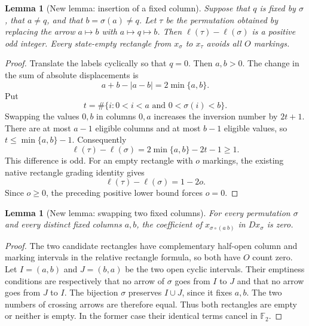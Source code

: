 \documentclass[11pt,oneside]{report}
\newtheorem{lemma}[theorem]{Lemma}
\theoremstyle{definition}
\numberwithin{equation}{section}
\begin{document}
\begin{lemma}[New lemma: insertion of a fixed column]
\label{J21:lem:torus-insertion-increases}
Suppose that $q$ is fixed by $\sigma$, that $a\neq q$, and that
$b=\sigma(a)\neq q$. Let $\tau$ be the permutation obtained by replacing
the arrow $a\mapsto b$ with $a\mapsto q\mapsto b$. Then
$\ell(\tau)-\ell(\sigma)$ is a positive odd integer.
Every state-empty rectangle from $x_\sigma$ to $x_\tau$ avoids all
$O$ markings.
\end{lemma}
\begin{proof}
Translate the labels cyclically so that $q=0$. Then $a,b>0$.
The change in the sum of absolute displacements is
\[
 a+b-|a-b|=2\min\{a,b\}.
\]
Put
\[
 t=\#\{i:0<i<a\text{ and }0<\sigma(i)<b\}.
\]
Swapping the values $0,b$ in columns $0,a$ increases the inversion
number by $2t+1$. There are at most $a-1$ eligible columns and at most
$b-1$ eligible values, so $t\leq\min\{a,b\}-1$. Consequently
\[
 \ell(\tau)-\ell(\sigma)=2\min\{a,b\}-2t-1\geq1.
\]
This difference is odd. For an empty rectangle with $o$ markings, the
existing native rectangle grading identity gives
\[
 \ell(\tau)-\ell(\sigma)=1-2o.
\]
Since $o\geq0$, the preceding positive lower bound forces $o=0$.
\end{proof}

\begin{lemma}[New lemma: swapping two fixed columns]
\label{J21:lem:torus-fixed-columns-cancel}
For every permutation $\sigma$ and every distinct fixed columns $a,b$,
the coefficient of $x_{\sigma\circ(a\ b)}$ in $D x_\sigma$ is zero.
\end{lemma}
\begin{proof}
The two candidate rectangles have complementary half-open column and
marking intervals in the relative rectangle formula, so both have
$O$ count zero. Let $I=(a,b)$ and $J=(b,a)$ be the two open cyclic
intervals. Their emptiness conditions are respectively that no arrow
of $\sigma$ goes from $I$ to $J$ and that no arrow goes from $J$ to $I$.
The bijection $\sigma$ preserves $I\cup J$, since it fixes $a,b$.
The two numbers of crossing arrows are therefore equal. Thus both
rectangles are empty or neither is empty. In the former case their
identical terms cancel in $\mathbb F _2$.
\end{proof}
\end{document}
